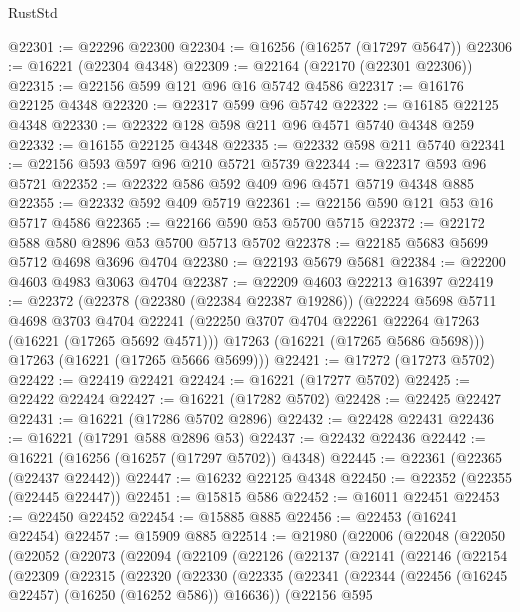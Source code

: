 \begin{lexlean}{RustStd}
\begin{coremodule}
@22301 := @22296 @22300
@22304 := @16256 (@16257 (@17297 @5647))
@22306 := @16221 (@22304 @4348)
@22309 := @22164 (@22170 (@22301 @22306))
@22315 := @22156 @599 @121 @96 @16 @5742 @4586
@22317 := @16176 @22125 @4348
@22320 := @22317 @599 @96 @5742
@22322 := @16185 @22125 @4348
@22330 := @22322 @128 @598 @211 @96 @4571 @5740 @4348 @259
@22332 := @16155 @22125 @4348
@22335 := @22332 @598 @211 @5740
@22341 := @22156 @593 @597 @96 @210 @5721 @5739
@22344 := @22317 @593 @96 @5721
@22352 := @22322 @586 @592 @409 @96 @4571 @5719 @4348 @885
@22355 := @22332 @592 @409 @5719
@22361 := @22156 @590 @121 @53 @16 @5717 @4586
@22365 := @22166 @590 @53 @5700 @5715
@22372 := @22172 @588 @580 @2896 @53 @5700 @5713 @5702
@22378 := @22185 @5683 @5699 @5712 @4698 @3696 @4704
@22380 := @22193 @5679 @5681
@22384 := @22200 @4603 @4983 @3063 @4704
@22387 := @22209 @4603 @22213 @16397
@22419 := @22372
    (@22378
      (@22380 (@22384 @22387 @19286))
      (@22224
        @5698
        @5711
        @4698
        @3703
        @4704
        @22241
        (@22250 @3707 @4704 @22261 @22264 @17263 (@16221 (@17265 @5692 @4571)))
        @17263
        (@16221 (@17265 @5686 @5698)))
      @17263
      (@16221 (@17265 @5666 @5699)))
@22421 := @17272 (@17273 @5702)
@22422 := @22419 @22421
@22424 := @16221 (@17277 @5702)
@22425 := @22422 @22424
@22427 := @16221 (@17282 @5702)
@22428 := @22425 @22427
@22431 := @16221 (@17286 @5702 @2896)
@22432 := @22428 @22431
@22436 := @16221 (@17291 @588 @2896 @53)
@22437 := @22432 @22436
@22442 := @16221 (@16256 (@16257 (@17297 @5702)) @4348)
@22445 := @22361 (@22365 (@22437 @22442))
@22447 := @16232 @22125 @4348
@22450 := @22352 (@22355 (@22445 @22447))
@22451 := @15815 @586
@22452 := @16011 @22451
@22453 := @22450 @22452
@22454 := @15885 @885
@22456 := @22453 (@16241 @22454)
@22457 := @15909 @885
@22514 := @21980
    (@22006
      (@22048
        (@22050
          (@22052
            (@22073
              (@22094
                (@22109
                  (@22126
                    (@22137
                      (@22141
                        (@22146
                          (@22154
                            (@22309
                              (@22315
                                (@22320
                                  (@22330
                                    (@22335
                                      (@22341
                                        (@22344
                                          (@22456 (@16245 @22457) (@16250 (@16252 @586)) @16636))
                                        (@22156
                                          @595

\end{coremodule}
\end{lexlean}
